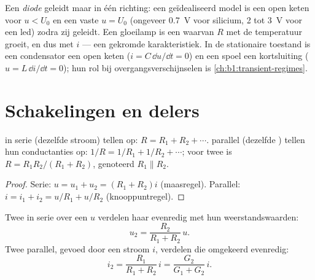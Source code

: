 \begin{remark}\label{rem:b1:dc-circuits:others}
Een \emph{diode} geleidt maar in één richting: een geïdealiseerd model is een
open keten voor $u < U_0$ en een vaste  $u = U_0$ (ongeveer
\qty{0.7}{V} voor silicium, \qty{2}{} tot \qty{3}{V} voor een led) zodra zij
geleidt. Een gloeilamp is een  waarvan $R$ met de temperatuur groeit,
en dus met $i$ --- een gekromde karakteristiek. In de stationaire toestand is
een condensator een open keten ($i = C\,\dd u/\dd t = 0$) en een
spoel een kortsluiting ($u = L\,\dd i/\dd t = 0$); hun rol bij
overgangsverschijnselen is \cref{ch:b1:transient-regimes}.
\end{remark}

\section{Schakelingen en delers}

\begin{proposition}\label{prop:b1:dc-circuits:seriesparallel}
 in serie (dezelfde stroom) tellen op: $R = R_1 + R_2 + \cdots$.
 parallel (dezelfde ) tellen hun conductanties op:
$1/R = 1/R_1 + 1/R_2 + \cdots$; voor twee is $R = R_1R_2/(R_1 + R_2)$,
genoteerd $R_1 \parallel R_2$.
\end{proposition}

\begin{proof}
Serie: $u = u_1 + u_2 = (R_1 + R_2)i$ (maasregel). Parallel: $i = i_1 +
i_2 = u/R_1 + u/R_2$ (knooppuntregel).
\end{proof}

\begin{proposition}\label{prop:b1:dc-circuits:dividers}
Twee  in serie over een  $u$ verdelen haar evenredig met
hun weerstandswaarden:
\[
u_2 = \frac{R_2}{R_1 + R_2}\,u .
\]
Twee  parallel, gevoed door een stroom $i$, verdelen die omgekeerd
evenredig:
\[
i_2 = \frac{R_1}{R_1 + R_2}\,i = \frac{G_2}{G_1 + G_2}\,i .
\]
\end{proposition}

